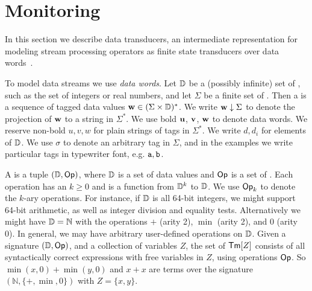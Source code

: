 \section{Monitoring}
\label{sec:monitoring}


In this section we describe data transducers,
an intermediate representation for modeling
stream processing operators as finite state transducers
over data words~.


To model data streams we use \emph{data words}.
Let $\mathbb{D}$ be a (possibly infinite) set of ,
such as the set of integers or real numbers,
and let $\Sigma$ be a finite set of .
Then a  is a sequence of tagged data values
$\textbf{w} \in (\Sigma \times \mathbb{D})^*$.
We write $\textbf{w} \downarrow \Sigma$ to denote
the projection of $\textbf{w}$ to a string in $\Sigma^*$.
We use bold $\textbf{u}$, $\textbf{v}$, $\textbf{w}$ to denote data words.
We reserve non-bold $u, v, w$ for plain strings of tags in $\Sigma^*$.
We write $d, d_i$ for elements of $\mathbb{D}$.
We use $\sigma$ to denote an arbitrary tag in $\Sigma$,
and in the examples we write particular tags in typewriter font, e.g. $\texttt{a}, \texttt{b}$.

A  is a tuple $(\mathbb{D}, \textsf{Op})$,
where $\mathbb{D}$ is a set of data values
and $\textsf{Op}$ is a set of .
Each operation has an  $k \ge 0$
and is a function from $\mathbb{D}^k$ to $\mathbb{D}$.
We use $\textsf{Op}_k$ to denote the $k$-ary operations.
For instance, if $\mathbb{D}$ is all 64-bit integers, we might support 64-bit arithmetic, as well as
integer division and equality tests.
Alternatively we might have $\mathbb{D} = \mathbb{N}$
with the operations $+$ (arity 2), $\min$ (arity 2), and $0$ (arity 0).
In general, we may have arbitrary user-defined operations on $\mathbb{D}$.
Given a signature $(\mathbb{D}, \textsf{Op})$,
and a collection of variables $Z$,
the set of  $\textsf{Tm}[Z]$
consists of all syntactically correct expressions
with free variables in $Z$, using operations $\textsf{Op}$.
So $\min(x,0) + \min(y,0)$ and $x + x$
are terms over the signature $(\mathbb{N}, \{+,\min,0\})$ with $Z = \{x,y\}$.

